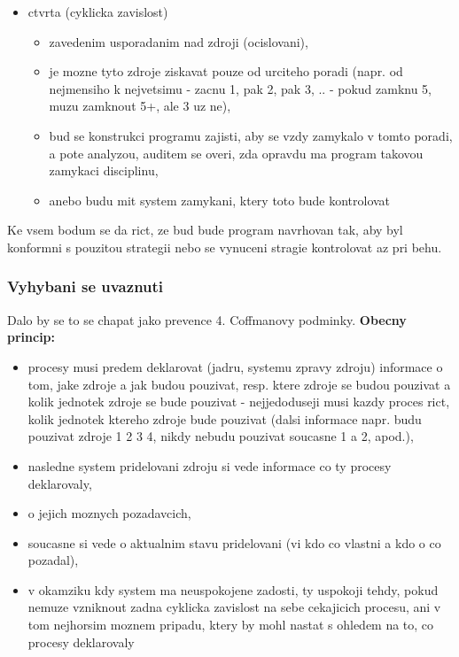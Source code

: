 \documentclass[a4paper, 11pt]{article}
\begin{document}
\begin{itemize}
\begin{itemize}
    \end{itemize}
    \item ctvrta (cyklicka zavislost)
    \begin{itemize}
        \item zavedenim usporadanim nad zdroji (ocislovani),
        \item je mozne tyto zdroje ziskavat pouze od urciteho poradi (napr. od nejmensiho k nejvetsimu - zacnu 1, pak 2, pak 3, .. - pokud zamknu 5, muzu zamknout 5+, ale 3 uz ne), 
        \item bud se konstrukci programu zajisti, aby se vzdy zamykalo v tomto poradi, a pote analyzou, auditem se overi, zda opravdu ma program takovou zamykaci disciplinu,
        \item anebo budu mit system zamykani, ktery toto bude kontrolovat \\
    \end{itemize}
\end{itemize}

Ke vsem bodum se da rict, ze bud bude program navrhovan tak, aby byl konformni s pouzitou strategii nebo se vynuceni stragie kontrolovat az pri behu. \\

\subsubsection{Vyhybani se uvaznuti}
Dalo by se to se chapat jako prevence 4. Coffmanovy podminky. \textbf{Obecny princip:}
\begin{itemize}
    \item procesy musi predem deklarovat (jadru, systemu zpravy zdroju) informace o tom, jake zdroje a jak budou pouzivat, resp. ktere zdroje se budou pouzivat a kolik jednotek zdroje se bude pouzivat - nejjedoduseji musi kazdy proces rict, kolik jednotek ktereho zdroje bude pouzivat (dalsi informace napr. budu pouzivat zdroje 1 2 3 4, nikdy nebudu pouzivat soucasne 1 a 2, apod.),
    \item nasledne system pridelovani zdroju si vede informace co ty procesy deklarovaly,
    \item o jejich moznych pozadavcich,
    \item soucasne si vede o aktualnim stavu pridelovani (vi kdo co vlastni a kdo o co pozadal),
    \item v okamziku kdy system ma neuspokojene zadosti, ty uspokoji tehdy, pokud nemuze vzniknout zadna cyklicka zavislost na sebe cekajicich procesu, ani v tom nejhorsim moznem pripadu, ktery by mohl nastat s ohledem na to, co procesy deklarovaly \\
\end{itemize}
\end{document}
